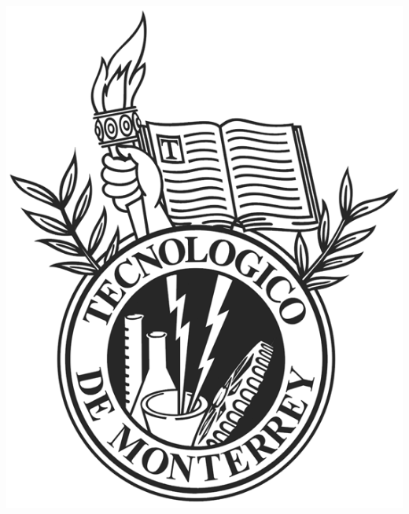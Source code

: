\pagestyle{empty}
\begin{center}
\begin{center}
\includegraphics[scale=0.45]{images/escudo-itesm_small.png}
\end{center}
\vspace{15 pt}
\renewcommand{\baselinestretch}{1.0}
\Huge

\end{center}
